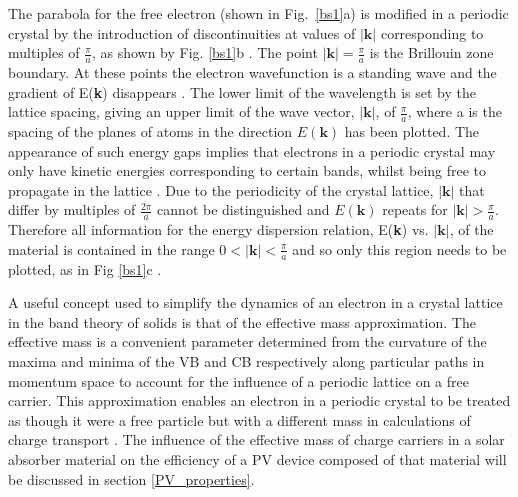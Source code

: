 \documentclass[11pt, twoside]{report}
\begin{document}
The parabola for the free electron (shown in  Fig.~\ref{bs1}a) is modified in a periodic crystal by the introduction of discontinuities at values of $|\boldsymbol{k}|$ corresponding to multiples of $\frac{\pi}{a}$, as shown by Fig. \ref{bs1}b \cite{small_semiconductor2}. The point $|\boldsymbol{k}| = \frac{\pi}{a}$ is the Brillouin zone boundary. At these points the electron wavefunction is a standing wave and the gradient of E(\textbf{k}) disappears \cite{Nelson3}.
The lower limit of the wavelength is set by the lattice spacing, giving an upper limit of the wave vector, $|\boldsymbol{k}|$, of $\frac{\pi}{a}$, where a is the spacing of the planes of atoms in the direction $E(\boldsymbol{k})$ has been plotted.  The appearance of such energy gaps implies that electrons in a periodic crystal may only have kinetic energies corresponding to certain bands, whilst being free to propagate in the lattice \cite{small_semiconductor2}.
Due to the periodicity of the crystal lattice, $|\boldsymbol{k}|$  that differ by multiples of $\frac{2\pi}{a}$ cannot be distinguished and $E(\boldsymbol{k})$ repeats for $|\boldsymbol{k}| > \frac{\pi}{a}$. 
Therefore all information for the energy dispersion relation, E(\textbf{k}) vs. $|\boldsymbol{k}|$, of the material is contained in the range $0 < |\boldsymbol{k}| < \frac{\pi}{a}$ and so only this region needs to be plotted, as in Fig \ref{bs1}c \cite{Nelson3}. 

A useful concept used to simplify the dynamics of an electron in a crystal lattice in the band theory of solids is that of the effective mass approximation. The effective mass is a convenient parameter determined from the curvature of the maxima and minima of the VB and CB respectively along particular paths in momentum space to account for the influence of a periodic lattice on a free carrier. This approximation enables an electron in a periodic crystal to be treated as though it were a free particle but with a different mass in calculations of charge transport \cite{small_semiconductor2}.
The influence of the effective mass of charge carriers in a solar absorber material on the efficiency of a PV device composed of that material will be discussed in section \ref{PV_properties}.
\end{document}
